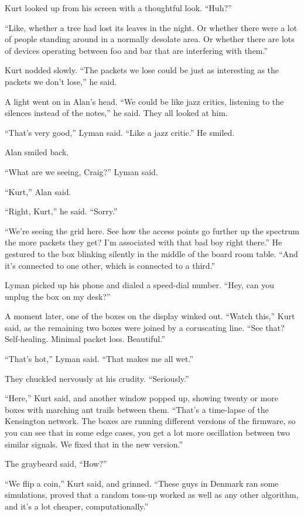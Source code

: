 Kurt looked up from his screen with a thoughtful look.  ``Huh?''

``Like, whether a tree had lost its leaves in the night.  Or whether
there were a lot of people standing around in a normally desolate
area.  Or whether there are lots of devices operating between foo and
bar that are interfering with them.''

Kurt nodded slowly.  ``The packets we lose could be just as
interesting as the packets we don't lose,'' he said.

A light went on in Alan's head.  ``We could be like jazz critics,
listening to the silences instead of the notes,'' he said.  They all
looked at him.

``That's very good,'' Lyman said.  ``Like a jazz critic.'' He smiled.

Alan smiled back.

``What are we seeing, Craig?'' Lyman said.

``Kurt,'' Alan said.

``Right, Kurt,'' he said.  ``Sorry.''

``We're seeing the grid here.  See how the access points go further up
the spectrum the more packets they get?  I'm associated with that bad
boy right there.'' He gestured to the box blinking silently in the
middle of the board room table.  ``And it's connected to one other,
which is connected to a third.''

Lyman picked up his phone and dialed a speed-dial number.  ``Hey, can
you unplug the box on my desk?''

A moment later, one of the boxes on the display winked out.  ``Watch
this,'' Kurt said, as the remaining two boxes were joined by a
coruscating line.  ``See that?  Self-healing.  Minimal packet loss. 
Beautiful.''

``That's hot,'' Lyman said.  ``That makes me all wet.''

They chuckled nervously at his crudity.  ``Seriously.''

``Here,'' Kurt said, and another window popped up, showing twenty or
more boxes with marching ant trails between them.  ``That's a
time-lapse of the Kensington network.  The boxes are running different
versions of the firmware, so you can see that in some edge cases, you
get a lot more oscillation between two similar signals.  We fixed that
in the new version.''

The graybeard said, ``How?''

``We flip a coin,'' Kurt said, and grinned.  ``These guys in Denmark
ran some simulations, proved that a random toss-up worked as well as
any other algorithm, and it's a lot cheaper, computationally.''

